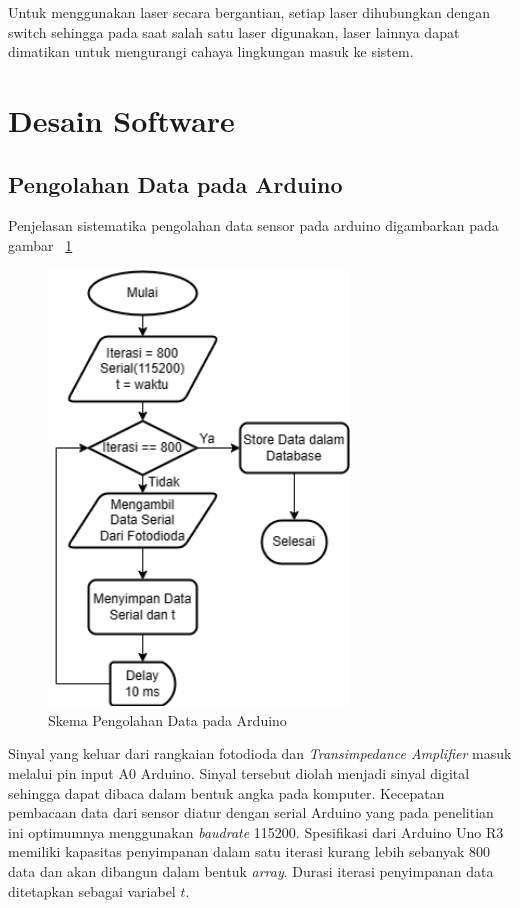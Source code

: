 \noindent
Untuk menggunakan laser secara bergantian, setiap laser dihubungkan dengan switch
sehingga pada saat salah satu laser digunakan, laser lainnya dapat dimatikan untuk
mengurangi cahaya lingkungan masuk ke sistem.



\section{Desain Software}

\subsection{Pengolahan Data pada Arduino}
Penjelasan sistematika pengolahan data sensor pada arduino digambarkan pada gambar
~\ref{fig:schemaard}

\begin{figure}[H]
    \centering
    \includegraphics[width=8cm]{Images/Skema Arduino.png}
    \caption{Skema Pengolahan Data pada Arduino}
    \label{fig:schemaard}
\end{figure}
Sinyal yang keluar dari rangkaian fotodioda dan \textit{Transimpedance Amplifier} masuk melalui
pin input A0 Arduino. Sinyal tersebut diolah menjadi sinyal digital sehingga dapat dibaca dalam
bentuk angka pada komputer. Kecepatan pembacaan data dari sensor diatur dengan serial Arduino
yang pada penelitian ini optimumnya menggunakan \textit{baudrate} 115200. Spesifikasi dari
Arduino Uno R3 memiliki kapasitas penyimpanan dalam satu iterasi kurang lebih sebanyak 800
data dan akan dibangun dalam bentuk \textit{array}. Durasi iterasi penyimpanan data ditetapkan
sebagai variabel ${t}$.



